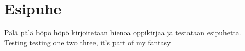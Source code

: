 \chapter{Esipuhe}

Pälä pälä höpö höpö kirjoitetaan hienoa oppikirjaa ja testataan esipuhetta. Testing testing one two three, it's part of my fantasy~

